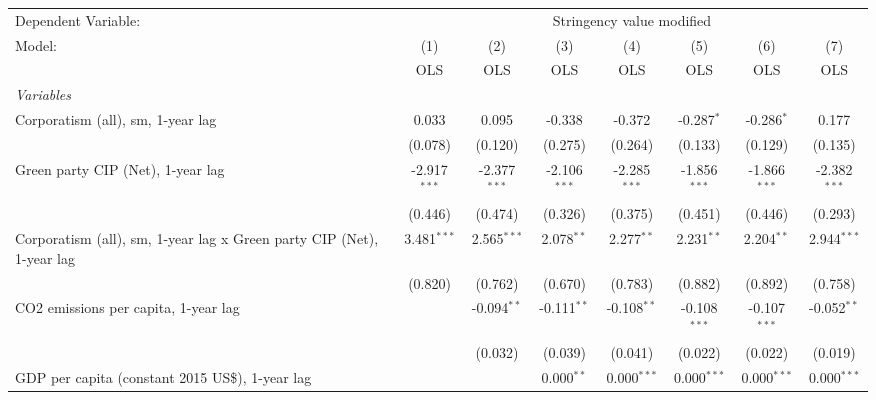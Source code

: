 
\begingroup
\centering
\begin{tabular}{lccccccc}
   \toprule
   Dependent Variable: & \multicolumn{7}{c}{Stringency value modified}\\
   Model:                                                                & (1)            & (2)            & (3)            & (4)            & (5)            & (6)            & (7)\\  
                                                                         &  OLS           & OLS            & OLS            & OLS            & OLS            & OLS            & OLS\\  
   \midrule
   \emph{Variables}\\
   Corporatism (all), sm, 1-year lag                                     & 0.033          & 0.095          & -0.338         & -0.372         & -0.287$^{*}$   & -0.286$^{*}$   & 0.177\\   
                                                                         & (0.078)        & (0.120)        & (0.275)        & (0.264)        & (0.133)        & (0.129)        & (0.135)\\   
   Green party CIP (Net), 1-year lag                                     & -2.917$^{***}$ & -2.377$^{***}$ & -2.106$^{***}$ & -2.285$^{***}$ & -1.856$^{***}$ & -1.866$^{***}$ & -2.382$^{***}$\\   
                                                                         & (0.446)        & (0.474)        & (0.326)        & (0.375)        & (0.451)        & (0.446)        & (0.293)\\   
   Corporatism (all), sm, 1-year lag x Green party CIP (Net), 1-year lag & 3.481$^{***}$  & 2.565$^{***}$  & 2.078$^{**}$   & 2.277$^{**}$   & 2.231$^{**}$   & 2.204$^{**}$   & 2.944$^{***}$\\   
                                                                         & (0.820)        & (0.762)        & (0.670)        & (0.783)        & (0.882)        & (0.892)        & (0.758)\\   
   CO2 emissions per capita, 1-year lag                                  &                & -0.094$^{**}$  & -0.111$^{**}$  & -0.108$^{**}$  & -0.108$^{***}$ & -0.107$^{***}$ & -0.052$^{**}$\\   
                                                                         &                & (0.032)        & (0.039)        & (0.041)        & (0.022)        & (0.022)        & (0.019)\\   
   GDP per capita (constant 2015 US\$), 1-year lag                       &                &                & 0.000$^{**}$   & 0.000$^{***}$  & 0.000$^{***}$  & 0.000$^{***}$  & 0.000$^{***}$\\   

\end{tabular}
